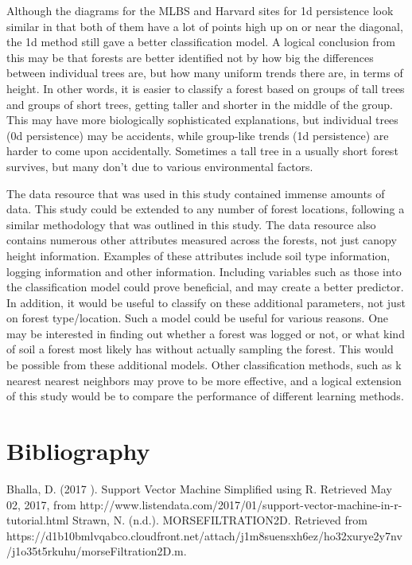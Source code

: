 \documentclass[10pt]{article}
\begin{document}
\indent Although the diagrams for the MLBS and Harvard sites for 1d persistence look similar in that both of them have a lot of points high up on or near the diagonal, the 1d method still gave a better classification model. A logical conclusion from this may be that forests are better identified not by how big the differences between individual trees are, but how many uniform trends there are, in terms of height. In other words, it is easier to classify a forest based on groups of tall trees and groups of short trees, getting taller and shorter in the middle of the group. This may have more biologically sophisticated explanations, but individual trees (0d persistence) may be accidents, while group-like trends (1d persistence) are harder to come upon accidentally. Sometimes a tall tree in a usually short forest survives, but many don't due to various environmental factors.

\indent The data resource that was used in this study contained immense amounts of data. This study could be extended to any number of forest locations, following a similar methodology that was outlined in this study. The data resource also contains numerous other attributes measured across the forests, not just canopy height information. Examples of these attributes include soil type information, logging information and other information. Including variables such as those into the classification model could prove beneficial, and may create a better predictor. In addition, it would be useful to classify on these additional parameters, not just on forest type/location. Such a model could be useful for various reasons. One may be interested in finding out whether a forest was logged or not, or what kind of soil a forest most likely has without actually sampling the forest. This would be possible from these additional models. Other classification methods, such as k nearest nearest neighbors may prove to be more effective, and a logical extension of this study would be to compare the performance of different learning methods.

\section*{Bibliography}
Bhalla, D. (2017 ). Support Vector Machine Simplified using R. Retrieved May 02, 2017, from http://www.listendata.com/2017/01/support-vector-machine-in-r-tutorial.html
Strawn, N. (n.d.). MORSEFILTRATION2D. Retrieved from https://d1b10bmlvqabco.cloudfront.net/attach/j1m8suensxh6ez/ho32xurye2y7nv/j1o35t5rkuhu/morseFiltration2D.m.
\end{document}
